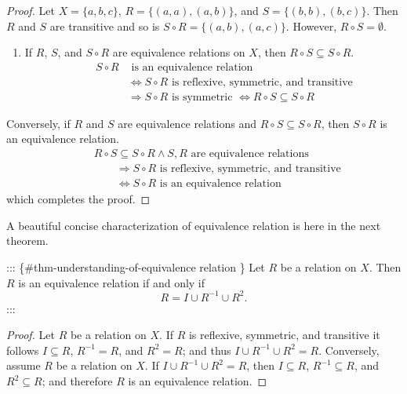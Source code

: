 \documentclass[
  letterpaper,
  10pt,
  reqno,
  twopage,
  openany]{book}
\providecommand{\tightlist}{%
  \setlength{\itemsep}{0pt}\setlength{\parskip}{0pt}}\usepackage{longtable,booktabs,array}
\theoremstyle{plain}
\theoremstyle{definition}
\theoremstyle{definition}
\theoremstyle{definition}
\theoremstyle{plain}
\theoremstyle{plain}
\theoremstyle{remark}
\begin{document}
\begin{proof}
Let \(X=\{a,b,c\}\), \(R=\{(a,a), (a,b)\}\), and \(S=\{(b,b),(b,c)\}.\)
Then \(R\) and \(S\) are transitive and so is
\(S\circ R=\{(a,b),(a,c)\}.\) However, \(R\circ S=\emptyset.\)

\begin{enumerate}
\def\labelenumi{\arabic{enumi}.}
\setcounter{enumi}{2}
\tightlist
\item
  If \(R\), \(S\), and \(S\circ R\) are equivalence relations on \(X\),
  then \(R\circ S \subseteq S\circ R.\) \begin{align*}
  \qquad S\circ R & \textrm{ is an equivalence relation} \\ 
  & \Longleftrightarrow S\circ R \textrm{ is reflexive, symmetric, and transitive} \\ 
  & \Longrightarrow S\circ R \textrm{ is symmetric } \Longleftrightarrow R\circ S \subseteq S\circ R
  \end{align*}
\end{enumerate}

Conversely, if \(R\) and \(S\) are equivalence relations and
\(R\circ S\subseteq S\circ R\), then \(S\circ R\) is an equivalence
relation. \begin{align*}
\qquad & R\circ S \subseteq S\circ R \land S, R \textrm{ are equivalence relations} \\ 
& \qquad \Longrightarrow S\circ R \textrm{ is reflexive, symmetric, and transitive } \\ 
& \qquad \Longleftrightarrow S\circ R \textrm{ is an equivalence relation }
\end{align*} which completes the proof.

\end{proof}

A beautiful concise characterization of equivalence relation is here in
the next theorem.

::: \{\#thm-understanding-of-equivalence relation \} Let \(R\) be a
relation on \(X.\) Then \(R\) is an equivalence relation if and only if
\[
R=I\cup R^{-1} \cup R^2.
\] :::

\begin{proof}

Let \(R\) be a relation on \(X.\) If \(R\) is reflexive, symmetric, and
transitive it follows \(I\subseteq R\), \(R^{-1} =R\), and \(R^2=R\);
and thus \(I\cup R^{-1}\cup R^2=R.\) Conversely, assume \(R\) be a
relation on \(X.\) If \(I\cup R^{-1}\cup R^2=R\), then \(I\subseteq R\),
\(R^{-1} \subseteq R\), and \(R^2\subseteq R\); and therefore \(R\) is
an equivalence relation.

\end{proof}
\end{document}
